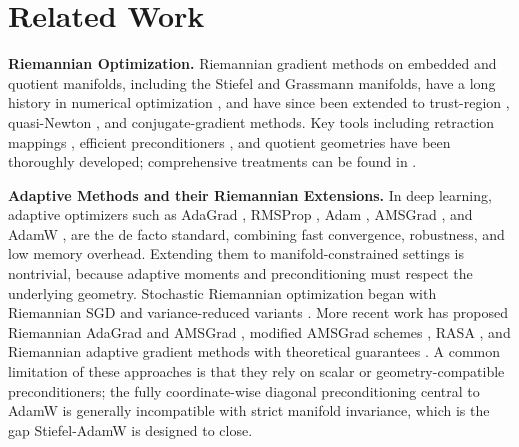 \documentclass[11pt,a4paper]{article}
\numberwithin{equation}{section}
\newcommand{\algname}{Stiefel-AdamW}
\theoremstyle{plain}
\theoremstyle{definition}
\theoremstyle{remark}
\begin{document}
\section{Related Work}
\textbf{Riemannian Optimization.}
Riemannian gradient methods on embedded and quotient manifolds, including the Stiefel and Grassmann manifolds, have a long history in numerical optimization \cite{Luenberger:1972,Gabay:1976,EAS:1998,Yang2007}, and have since been extended to trust-region \cite{ABG:2007}, quasi-Newton \cite{RingWirth:2012}, and conjugate-gradient \cite{SatoIwai:2015,Sato:2016,Sato:2022} methods. Key tools including retraction mappings \cite{Absil:2012,AbsilOseledets2015}, efficient preconditioners \cite{Vandereycken:2010,BOUMAL2015200}, and quotient geometries \cite{Mishra2014} have been thoroughly developed; comprehensive treatments can be found in \cite{AMS:2008,Sato:2021,boumal_2023}.

\textbf{Adaptive Methods and their Riemannian Extensions.}
In deep learning, adaptive optimizers such as AdaGrad \cite{Duchi:2011}, RMSProp \cite{Hinton:2012}, Adam \cite{kingma2015adam}, AMSGrad \cite{convergence_adam_beyond}, and AdamW \cite{Loshchilov:2019}, are the de facto standard, combining fast convergence, robustness, and low memory overhead. Extending them to manifold-constrained settings is nontrivial, because adaptive moments and preconditioning must respect the underlying geometry. Stochastic Riemannian optimization began with Riemannian SGD \cite{Bonnabel:2013} and variance-reduced variants \cite{NIPS2016_98e6f172,pmlr-v80-kasai18a}. More recent work has proposed Riemannian AdaGrad and AMSGrad \cite{BecigneulGanea:2019}, modified AMSGrad schemes \cite{SakaiIiduka:2021}, RASA \cite{kasai2019riemannian}, and Riemannian adaptive gradient methods with theoretical guarantees \cite{bian2025finding,sakai2025a}. A common limitation of these approaches is that they rely on scalar or geometry-compatible preconditioners; the fully coordinate-wise diagonal preconditioning central to AdamW is generally incompatible with strict manifold invariance, which is the gap \algname{} is designed to close.

\medskip
\end{document}
